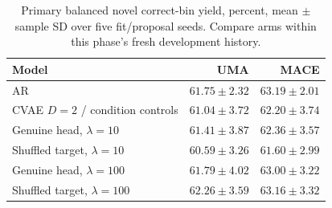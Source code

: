 \begin{table}[htbp]
\centering\small
\caption{Primary balanced novel correct-bin yield, percent, mean $\pm$ sample SD over five fit/proposal seeds. Compare arms within this phase's fresh development history.}
\begin{tabular}{lrr}\toprule
Model & UMA & MACE\\\midrule
AR & $61.75\pm2.32$ & $63.19\pm2.01$\\
CVAE $D=2$ / condition controls & $61.04\pm3.72$ & $62.20\pm3.74$\\
Genuine head, $\lambda=10$ & $61.41\pm3.87$ & $62.36\pm3.57$\\
Shuffled target, $\lambda=10$ & $60.59\pm3.26$ & $61.60\pm2.99$\\
Genuine head, $\lambda=100$ & $61.79\pm4.02$ & $63.00\pm3.22$\\
Shuffled target, $\lambda=100$ & $62.26\pm3.59$ & $63.16\pm3.32$\\
\bottomrule\end{tabular}
\end{table}
